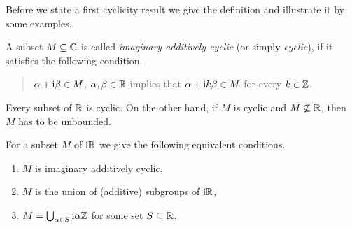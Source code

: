 Before we state a first cyclicity result we give the definition and illustrate it by some examples.
\begin{definition}\label{def:b3-2.5}

A subset $M \subseteq \mathbb{C}$ is called \emph{imaginary additively cyclic} 
(or simply \emph{cyclic}), if it satisfies the following condition. 
\begin{quote}
$\alpha + \mathrm{i}\beta \in M$, $\alpha,\beta \in \mathbb{R}$ implies that $\alpha +  \mathrm{i} k\beta \in M$ for every $k \in \mathbb{Z}$.
\end{quote}
\end{definition}
Every subset of\/ $\mathbb{R}$ is cyclic. 
On the other hand, if\/ $M$ is cyclic and $M \not\subseteq \mathbb{R}$, then $M$ has to be unbounded.
	
For a subset $M$ of\/ $\mathrm{i} \mathbb{R}$ we give the following equivalent conditions.
	\begin{enumerate}[\upshape (a)]
		\item 
		$M$ is imaginary additively cyclic,
		
		\item 
		$M$ is the union of (additive) subgroups of\/ $\mathrm{i} \mathbb{R}$, 
		
		\item 
		$M = \bigcup_{\alpha \in S} \mathrm{i}\alpha\mathbb{Z}$ for some set $S \subseteq \mathbb{R}$.
	\end{enumerate}
	
